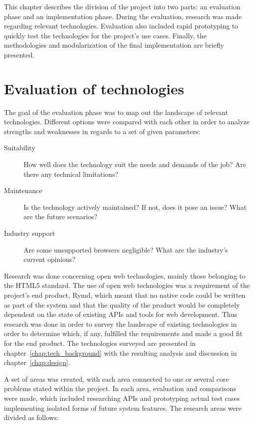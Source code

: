 This chapter describes the division of the project into two parts: an evaluation phase and an implementation phase. During the evaluation, research was made regarding relevant technologies. Evaluation also included rapid prototyping to quickly test the technologies for the project's use cases. Finally, the methodologies and modularization of the final implementation are briefly presented.

\section{Evaluation of technologies}

The goal of the evaluation phase was to map out the landscape of relevant technologies. Different options were compared with each other in order to analyze strengths and weaknesses in regards to a set of given parameters:

\begin{description}
  \item[Suitability] How well does the technology suit the needs and demands of the job? Are there any technical limitations?
  \item[Maintenance] Is the technology actively maintained? If not, does it pose an issue? What are the future scenarios?
  \item[Industry support] Are some unsupported browsers negligible? What are the industry's current opinions?
\end{description}

Research was done concerning open web technologies, mainly those belonging to the HTML5 standard. The use of open web technologies was a requirement of the project's end product, Rymd, which meant that no native code could be written as part of the system and that the quality of the product would be completely dependent on the state of existing APIs and tools for web development. Thus research was done in order to survey the landscape of existing technologies in order to determine which, if any, fulfilled the requirements and made a good fit for the end product. The technologies surveyed are presented in chapter~\ref{chap:tech_background} with the resulting analysis and discussion in chapter~\ref{chap:design}.

A set of areas was created, with each area connected to one or several core problems stated within the project. In each area, evaluation and comparisons were made, which included researching APIs and prototyping actual test cases implementing isolated forms of future system features. The research areas were divided as follows:

